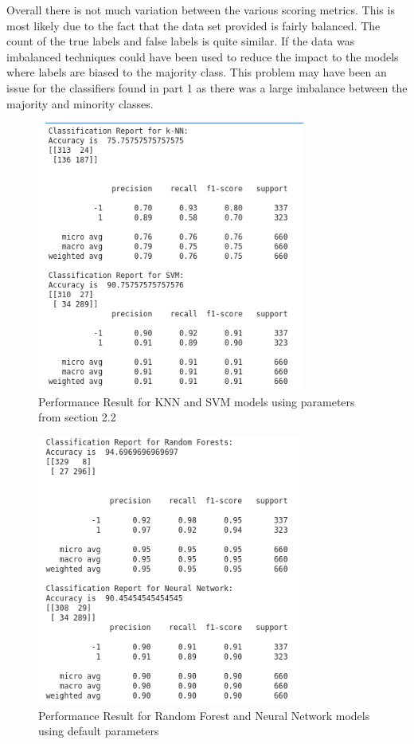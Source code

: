 Overall there is not much variation between the various scoring metrics. This is most likely due to the fact that the data set provided is fairly balanced. The count of the true labels and false labels is quite similar. If the data was imbalanced techniques could have been used to reduce the impact to the models where labels are biased to the majority class. This problem may have been an issue for the classifiers found in part 1 as there was a large imbalance between the majority and minority classes.

\begin{figure}[!ht]
 \centering
\includegraphics[height=3.5in]{assignment2/2-3-a1.png}
\caption{\label{fig:resultsknnsvm} Performance Result for KNN and SVM models using parameters from section 2.2}
\end{figure}
\clearpage{}
\begin{figure}[!ht]
 \centering
\includegraphics[height=3.5in]{assignment2/2-3-a2.png}
\caption{\label{fig:resulstsrfnn} Performance Result for Random Forest and Neural Network models using default parameters}
\end{figure}


